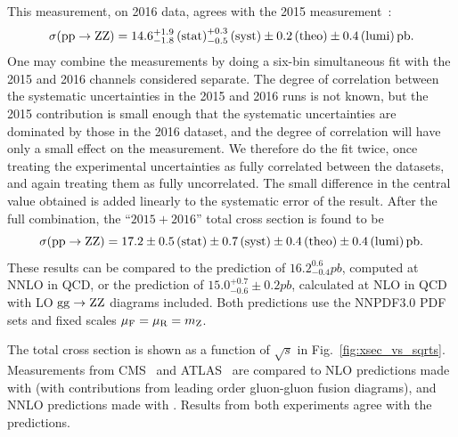This measurement, on 2016 data, agrees with the 2015 measurement~\cite{Khachatryan:2016txa}:
\begin{equation}
  \sigma(\mathrm{p}\mathrm{p} \to \mathrm{Z}\mathrm{Z}) = 14.6 ^{+1.9}_{-1.8} \,\text{(stat)} _{-0.5}^{+0.3} \,\text{(syst)} \pm 0.2 \,\text{(theo)} \pm 0.4 \,\text{(lumi)} \mathrm{\,pb}.
\end{equation}
One may combine the measurements by doing a six-bin simultaneous fit with the 2015 and 2016 channels considered separate.
The degree of correlation between the systematic uncertainties in the 2015 and 2016 runs is not known, but the 2015 contribution is small enough that the systematic uncertainties are dominated by those in the 2016 dataset, and the degree of correlation will have only a small effect on the measurement.
We therefore do the fit twice, once treating the experimental uncertainties as fully correlated between the datasets, and again treating them as fully uncorrelated.
The small difference in the central value obtained is added linearly to the systematic error of the result.
After the full combination, the ``$2015 + 2016$'' total cross section is found to be
\begin{equation}
  \sigma(\mathrm{p}\mathrm{p} \to \mathrm{Z}\mathrm{Z}) = 17.2 \pm 0.5 \,\text{(stat)} \pm 0.7 \,\text{(syst)} \pm 0.4 \,\text{(theo)} \pm 0.4 \,\text{(lumi)} \mathrm{\,pb}.
\end{equation}
These results can be compared to the {\MATRIX} prediction of $16.2^{0.6}_{-0.4}\unit{pb}$, computed at NNLO in QCD, or the {\MCFM} prediction of $15.0^{+0.7}_{-0.6} \pm 0.2\unit{pb}$, calculated at NLO in QCD with LO $\mathrm{g}\mathrm{g} \to \mathrm{Z}\mathrm{Z}$ diagrams included.
Both predictions use the NNPDF3.0 PDF sets and fixed scales $\mu_\text{F} = \mu_\text{R} = m_\mathrm{Z}$.

The total cross section is shown as a function of $\sqrt{s}$ in Fig.~\ref{fig:xsec_vs_sqrts}.
Measurements from CMS~\cite{Chatrchyan:2012sga,CMS:2014xja,Khachatryan:2015pba,Khachatryan:2016txa} and ATLAS~\cite{Aad:2012awa,Aad:2015rka,Aad:2015zqe} are compared to NLO predictions made with {\MCFM} (with contributions from leading order gluon-gluon fusion diagrams), and NNLO predictions made with {\MATRIX}.
Results from both experiments agree with the predictions.

